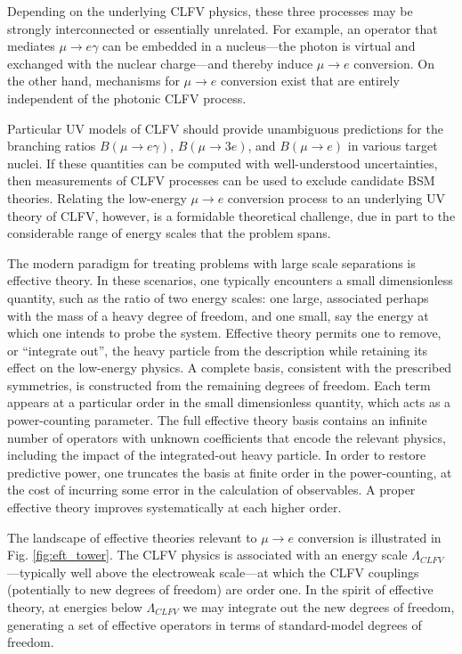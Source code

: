 \documentclass[12pt,letterpaper]{book}
\begin{document}
Depending on the underlying CLFV physics, these three processes may be strongly interconnected or essentially unrelated. For example, an operator that mediates $\mu\rightarrow e\gamma$ can be embedded in a nucleus---the photon is virtual and exchanged with the nuclear charge---and thereby induce $\mu\rightarrow e$ conversion. On the other hand, mechanisms for $\mu\rightarrow e$ conversion exist that are entirely independent of the photonic CLFV process. 

Particular UV models of CLFV should provide unambiguous predictions for the branching ratios $B(\mu\rightarrow e\gamma)$, $B(\mu\rightarrow 3e)$, and $B(\mu\rightarrow e)$ in various target nuclei. If these quantities can be computed with well-understood uncertainties, then measurements of CLFV processes can be used to exclude candidate BSM theories. Relating the low-energy $\mu\rightarrow e$ conversion process to an underlying UV theory of CLFV, however, is a formidable theoretical challenge, due in part to the considerable range of energy scales that the problem spans. 

The modern paradigm for treating problems with large scale separations is effective theory. In these scenarios, one typically encounters a small dimensionless quantity, such as the ratio of two energy scales: one large, associated perhaps with the mass of a heavy degree of freedom, and one small, say the energy at which one intends to probe the system. Effective theory permits one to remove, or ``integrate out'', the heavy particle from the description while retaining its effect on the low-energy physics. A complete basis, consistent with the prescribed symmetries, is constructed from the remaining degrees of freedom. Each term appears at a particular order in the small dimensionless quantity, which acts as a power-counting parameter. The full effective theory basis contains an infinite number of operators with unknown coefficients that encode the relevant physics, including the impact of the integrated-out heavy particle. In order to restore predictive power, one truncates the basis at finite order in the power-counting, at the cost of incurring some error in the calculation of observables. A proper effective theory improves systematically at each higher order.

The landscape of effective theories relevant to $\mu\rightarrow e$ conversion is illustrated in Fig. \ref{fig:eft_tower}. The CLFV physics is associated with an energy scale $\Lambda_{CLFV}$---typically well above the electroweak scale---at which the CLFV couplings (potentially to new degrees of freedom) are order one. In the spirit of effective theory, at energies below $\Lambda_{CLFV}$ we may integrate out the new degrees of freedom, generating a set of effective operators in terms of standard-model degrees of freedom.  
\end{document}
